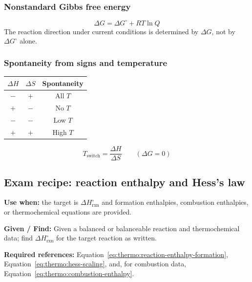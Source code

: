 \subsubsection{Nonstandard Gibbs free energy}
\begin{equation}
\Delta G=\Delta G^\circ+RT\ln Q
\label{eq:thermo:nonstandard-gibbs}
\end{equation}
The reaction direction under current conditions is determined by \(\Delta G\), not by \(\Delta G^\circ\) alone.

\subsubsection{Spontaneity from signs and temperature}
\begin{tabular}{@{}ccc@{}}
\toprule
\(\Delta H\) & \(\Delta S\) & Spontaneity\\
\midrule
\(-\) & \(+\) & All \(T\)\\
\(+\) & \(-\) & No \(T\)\\
\(-\) & \(-\) & Low \(T\)\\
\(+\) & \(+\) & High \(T\)\\
\bottomrule
\end{tabular}
\begin{equation}
T_{\mathrm{switch}}=\frac{\Delta H}{\Delta S}\qquad(\Delta G=0)
\label{eq:thermo:switch-temperature}
\end{equation}

\subsection{Exam recipe: reaction enthalpy and Hess's law}
\textbf{Use when:} the target is \(\Delta H^\circ_{\mathrm{rxn}}\) and formation enthalpies, combustion enthalpies, or thermochemical equations are provided.

\textbf{Given / Find:} Given a balanced or balanceable reaction and thermochemical data; find \(\Delta H^\circ_{\mathrm{rxn}}\) for the target reaction as written.

\textbf{Required references:} Equation~\eqref{eq:thermo:reaction-enthalpy-formation}, Equation~\eqref{eq:thermo:hess-scaling}, and, for combustion data, Equation~\eqref{eq:thermo:combustion-enthalpy}.

